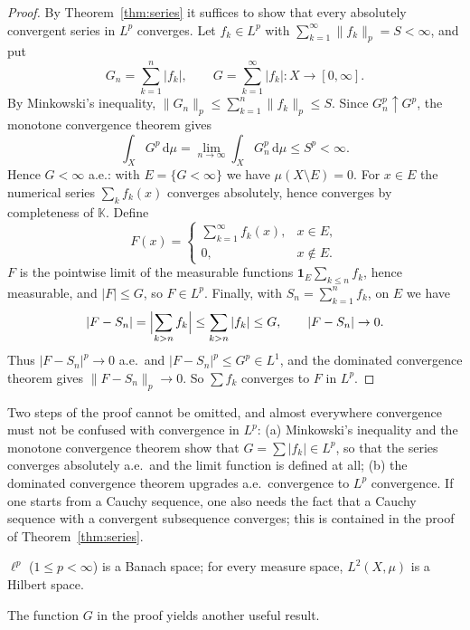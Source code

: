 \documentclass[11pt]{article}
\newcommand{\K}{\mathbb{K}}
\newcommand{\norm}[1]{\lVert #1\rVert}
\newcommand{\dmu}{\,\mathrm{d}\mu}
\newcommand{\ind}{\mathbf{1}}
\begin{document}
\begin{proof}
By Theorem~\ref{thm:series} it suffices to show that every absolutely convergent series in $L^{p}$ converges. Let $f_{k}\in L^{p}$ with $\sum_{k=1}^{\infty}\norm{f_{k}}_{p}=S<\infty$, and put
\[
G_{n}=\sum_{k=1}^{n}|f_{k}|,\qquad G=\sum_{k=1}^{\infty}|f_{k}|:X\to[0,\infty].
\]
By Minkowski's inequality, $\norm{G_{n}}_{p}\le\sum_{k=1}^{n}\norm{f_{k}}_{p}\le S$. Since $G_{n}^{p}\uparrow G^{p}$, the monotone convergence theorem gives
\[
\int_{X}G^{p}\dmu=\lim_{n\to\infty}\int_{X}G_{n}^{p}\dmu\le S^{p}<\infty .
\]
Hence $G<\infty$ a.e.: with $E=\{G<\infty\}$ we have $\mu(X\setminus E)=0$. For $x\in E$ the numerical series $\sum_{k}f_{k}(x)$ converges absolutely, hence converges by completeness of $\K$. Define
\[
F(x)=\begin{cases}\sum_{k=1}^{\infty}f_{k}(x),&x\in E,\\ 0,&x\notin E.\end{cases}
\]
$F$ is the pointwise limit of the measurable functions $\ind_{E}\sum_{k\le n}f_{k}$, hence measurable, and $|F|\le G$, so $F\in L^{p}$. Finally, with $S_{n}=\sum_{k=1}^{n}f_{k}$, on $E$ we have
\[
|F-S_{n}|=\Bigl|\sum_{k>n}f_{k}\Bigr|\le\sum_{k>n}|f_{k}|\le G,\qquad |F-S_{n}|\to0 .
\]
Thus $|F-S_{n}|^{p}\to0$ a.e.\ and $|F-S_{n}|^{p}\le G^{p}\in L^{1}$, and the dominated convergence theorem gives $\norm{F-S_{n}}_{p}\to0$. So $\sum f_{k}$ converges to $F$ in $L^{p}$.
\end{proof}

\begin{remark}
Two steps of the proof cannot be omitted, and almost everywhere convergence must not be confused with convergence in $L^{p}$: (a) Minkowski's inequality and the monotone convergence theorem show that $G=\sum|f_{k}|\in L^{p}$, so that the series converges absolutely a.e.\ and the limit function is defined at all; (b) the dominated convergence theorem upgrades a.e.\ convergence to $L^{p}$ convergence. If one starts from a Cauchy sequence, one also needs the fact that a Cauchy sequence with a convergent subsequence converges; this is contained in the proof of Theorem~\ref{thm:series}.
\end{remark}

\begin{corollary}
$\ell^{p}$ ($1\le p<\infty$) is a Banach space; for every measure space, $L^{2}(X,\mu)$ is a Hilbert space.
\end{corollary}

The function $G$ in the proof yields another useful result.
\end{document}

